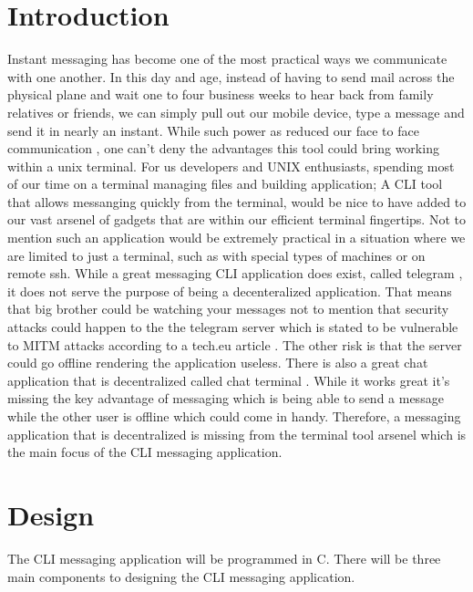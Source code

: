 \documentclass[twoside]{article}
\begin{document}
\begin{multicols}{2} %

\section{Introduction}

\lettrine[nindent=0em,lines=3]{I}{}nstant messaging has become one of the most practical ways we communicate with one another. In this day and age, instead of having to send mail across the physical plane and
wait one to four business weeks to hear back from family relatives or friends, we can simply pull out our mobile device, type a 
message and send it in nearly an instant. While such power as reduced our face to face communication \cite{hemmer}, one can't deny the
advantages this tool could bring working within a unix terminal. For us developers and
UNIX enthusiasts, spending most of our time on a terminal managing files and building application; A CLI tool that allows messanging quickly from the 
terminal, would be nice to have added to our vast arsenel of gadgets that are within 
our efficient terminal fingertips. Not to mention such an application would be extremely practical in a situation where we are limited 
to just a terminal, such as with special types of machines or on remote ssh. While a great messaging CLI application does exist, 
called telegram \cite{telegram}, it does not serve the purpose of being a decenteralized application. That means that big brother 
could be watching your messages not to mention that security attacks could happen to the the telegram server which is stated to be 
vulnerable to MITM attacks according to a tech.eu article \cite{wauters}. The other risk is that the server could go offline 
rendering the application useless. There is also a great chat application that is decentralized called chat terminal \cite{lanchat}. 
While it works great it's missing the key advantage of messaging which is being able to send a message while the other user is 
offline which could come in handy. Therefore,
a messaging application that is decentralized is missing from the terminal tool arsenel which is the main focus of the CLI messaging 
application. 


\section{Design}

The CLI messaging application will be programmed in C. There will be three main components to designing the CLI messaging application.


\end{multicols}
\end{document}
